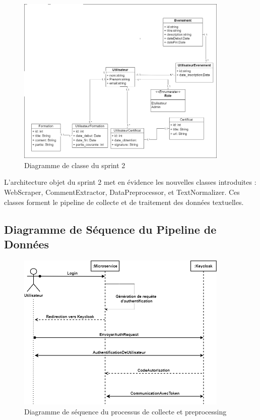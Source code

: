 \begin{figure}[H]
\centering
\includegraphics[width=0.9\textwidth]{assets/images/sprint2-class.png}
\caption{Diagramme de classe du sprint 2}
\label{fig:sprint2-class}
\end{figure}

L'architecture objet du sprint 2 met en évidence les nouvelles classes introduites : WebScraper, CommentExtractor, DataPreprocessor, et TextNormalizer. Ces classes forment le pipeline de collecte et de traitement des données textuelles.

\subsection{Diagramme de Séquence du Pipeline de Données}

\begin{figure}[H]
\centering
\includegraphics[width=0.9\textwidth]{assets/images/keycloak-seq.png}
\caption{Diagramme de séquence du processus de collecte et preprocessing}
\label{fig:data-pipeline-sequence}
\end{figure}

